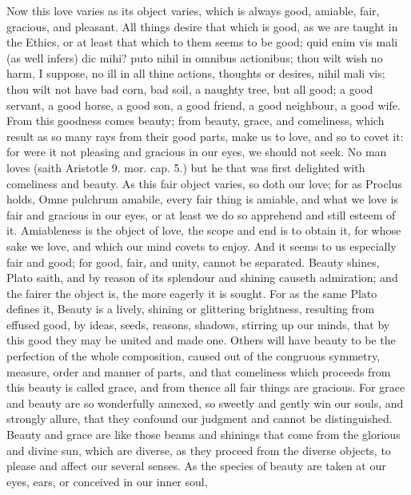 {Now this love varies as its object varies, which is always good,
amiable, fair, gracious, and pleasant. All things desire that
which is good, as we are taught in the Ethics, or at least that which
to them seems to be good; quid enim vis mali (as \Austin{} well infers)
dic mihi? puto nihil in omnibus actionibus; thou wilt wish no harm, I
suppose, no ill in all thine actions, thoughts or desires, nihil mali
vis; thou wilt not have bad corn, bad soil, a naughty tree, but
all good; a good servant, a good horse, a good son, a good friend, a
good neighbour, a good wife. From this goodness comes beauty; from
beauty, grace, and comeliness, which result as so many rays from their
good parts, make us to love, and so to covet it: for were it not
pleasing and gracious in our eyes, we should not seek. No man
loves (saith Aristotle 9. mor. cap. 5.) but he that was first delighted
with comeliness and beauty. As this fair object varies, so doth our
love; for as Proclus holds, Omne pulchrum amabile, every fair thing is
amiable, and what we love is fair and gracious in our eyes, or at least
we do so apprehend and still esteem of it.  Amiableness is the
object of love, the scope and end is to obtain it, for whose sake we
love, and which our mind covets to enjoy. And it seems to us especially
fair and good; for good, fair, and unity, cannot be separated. Beauty
shines, Plato saith, and by reason of its splendour and shining causeth
admiration; and the fairer the object is, the more eagerly it is
sought. For as the same Plato defines it, Beauty is a lively,
shining or glittering brightness, resulting from effused good, by
ideas, seeds, reasons, shadows, stirring up our minds, that by this
good they may be united and made one. Others will have beauty to be the
perfection of the whole composition, caused out of the congruous
symmetry, measure, order and manner of parts, and that comeliness which
proceeds from this beauty is called grace, and from thence all fair
things are gracious. For grace and beauty are so wonderfully annexed,
so sweetly and gently win our souls, and strongly allure, that
they confound our judgment and cannot be distinguished. Beauty and
grace are like those beams and shinings that come from the glorious and
divine sun, which are diverse, as they proceed from the diverse
objects, to please and affect our several senses. As the species
of beauty are taken at our eyes, ears, or conceived in our inner soul,
}
